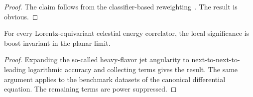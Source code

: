 \begin{proof}
The claim follows from the classifier-based
reweighting~\cite{TPC:0094-RIZZ-Real-Virtual-Invariant-Zero-Bin-Zeros-September-24-2026}.
The result is obvious.
\end{proof}

\begin{theorem}[Finiteness]\label{thm:3}
For every Lorentz-equivariant celestial energy correlator, the local
significance is boost invariant in the planar limit.
\end{theorem}

\begin{proof}
Expanding the so-called heavy-flavor jet angularity to
next-to-next-to-leading logarithmic accuracy and collecting terms gives
the result. The same argument applies to the benchmark datasets of the
canonical differential equation. The remaining terms are power
suppressed.
\end{proof}


